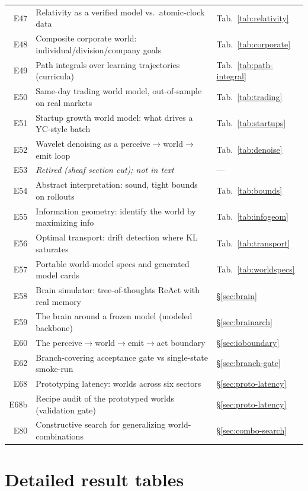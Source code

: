 \documentclass[11pt]{article}
\begin{document}
\begin{longtable}{@{}r p{} l@{}}
E47 & Relativity as a verified model vs.\ atomic-clock data & Tab.~\ref{tab:relativity} \\
E48 & Composite corporate world: individual/division/company goals & Tab.~\ref{tab:corporate} \\
E49 & Path integrals over learning trajectories (curricula) & Tab.~\ref{tab:path-integral} \\
E50 & Same-day trading world model, out-of-sample on real markets & Tab.~\ref{tab:trading} \\
E51 & Startup growth world model: what drives a YC-style batch & Tab.~\ref{tab:startups} \\
E52 & Wavelet denoising as a perceive$\to$world$\to$emit loop & Tab.~\ref{tab:denoise} \\
E53 & \emph{Retired (sheaf section cut); not in text} & --- \\
E54 & Abstract interpretation: sound, tight bounds on rollouts & Tab.~\ref{tab:bounds} \\
E55 & Information geometry: identify the world by maximizing info & Tab.~\ref{tab:infogeom} \\
E56 & Optimal transport: drift detection where KL saturates & Tab.~\ref{tab:transport} \\
E57 & Portable world-model specs and generated model cards & Tab.~\ref{tab:worldspecs} \\
E58 & Brain simulator: tree-of-thoughts ReAct with real memory & \S\ref{sec:brain} \\
E59 & The brain around a frozen model (modeled backbone) & \S\ref{sec:brainarch} \\
E60 & The perceive$\to$world$\to$emit$\to$act boundary & \S\ref{sec:ioboundary} \\
E62 & Branch-covering acceptance gate vs single-state smoke-run & \S\ref{sec:branch-gate} \\
E68 & Prototyping latency: \ProtoNumWorlds{} worlds across six sectors & \S\ref{sec:proto-latency} \\
E68b & Recipe audit of the prototyped worlds (validation gate) & \S\ref{sec:proto-latency} \\
E80 & Constructive search for generalizing world-combinations & \S\ref{sec:combo-search} \\
\end{longtable}
\endgroup



\section{Detailed result tables}\label{app:tables}
\end{document}
